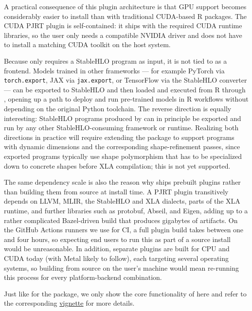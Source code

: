 A practical consequence of this plugin architecture is that GPU support becomes considerably easier to install than with traditional CUDA-based R packages.
The CUDA PJRT plugin is self-contained: it ships with the required CUDA runtime libraries, so the user only needs a compatible NVIDIA driver and does not have to install a matching CUDA toolkit on the host system.

Because  only requires a StableHLO program as input, it is not tied to  as a frontend.
Models trained in other frameworks --- for example PyTorch via \texttt{torch.export}, JAX via \texttt{jax.export}, or TensorFlow via the StableHLO converter --- can be exported to StableHLO and then loaded and executed from R through , opening up a path to deploy and run pre-trained models in R workflows without depending on the original Python toolchain.
The reverse direction is equally interesting: StableHLO programs produced by  can in principle be exported and run by any other StableHLO-consuming framework or runtime.
Realizing both directions in practice will require extending the  package to support programs with dynamic dimensions and the corresponding shape-refinement passes, since exported programs typically use shape polymorphism that has to be specialized down to concrete shapes before XLA compilation; this is not yet supported.

The same dependency scale is also the reason why  ships prebuilt plugins rather than building them from source at install time.
A PJRT plugin transitively depends on LLVM, MLIR, the StableHLO and XLA dialects, parts of the XLA runtime, and further libraries such as protobuf, Abseil, and Eigen, adding up to a rather complicated Bazel-driven build that produces gigabytes of artifacts.
On the GitHub Actions runners we use for CI, a full plugin build takes between one and four hours, so expecting end users to run this as part of a source install would be unreasonable.
In addition, separate plugins are built for CPU and CUDA today (with Metal likely to follow), each targeting several operating systems, so building from source on the user's machine would mean re-running this process for every platform-backend combination.

Just like for the  package, we only show the core functionality of  here and refer to the corresponding \href{https://r-xla.github.io/pjrt/articles/pjrt.html}{vignette} for more details.

